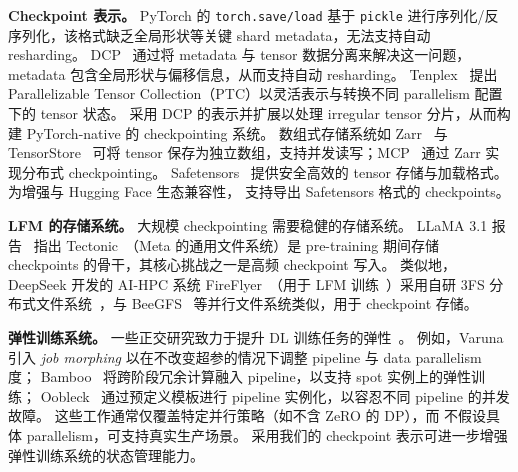 \noindent \textbf{Checkpoint 表示。}
PyTorch 的 \texttt{torch.save/load} 基于 \texttt{pickle} 进行序列化/反序列化，该格式缺乏全局形状等关键 shard metadata，无法支持自动 resharding。
DCP~\cite{torch-dcp} 通过将 metadata 与 tensor 数据分离来解决这一问题，metadata 包含全局形状与偏移信息，从而支持自动 resharding。
Tenplex~\cite{tenplex} 提出 Parallelizable Tensor Collection（PTC）以灵活表示与转换不同 parallelism 配置下的 tensor 状态。
\sys{} 采用 DCP 的表示并扩展以处理 irregular tensor 分片，从而构建 PyTorch-native 的 checkpointing 系统。
数组式存储系统如 Zarr~\cite{zarrZarr} 与 TensorStore~\cite{googleTensorStore} 可将 tensor 保存为独立数组，支持并发读写；MCP~\cite{megatron-dcp} 通过 Zarr 实现分布式 checkpointing。
Safetensors~\cite{huggingfaceSafetensors} 提供安全高效的 tensor 存储与加载格式。
为增强与 Hugging Face 生态兼容性，\sys{} 支持导出 Safetensors 格式的 checkpoints。

\noindent \textbf{LFM 的存储系统。}
大规模 checkpointing 需要稳健的存储系统。
LLaMA 3.1 报告~\cite{llama3.1} 指出 Tectonic~\cite{tectonic}（Meta 的通用文件系统）是 pre-training 期间存储 checkpoints 的骨干，其核心挑战之一是高频 checkpoint 写入。
类似地，DeepSeek 开发的 AI-HPC 系统 FireFlyer~\cite{fireflyer}（用于 LFM 训练~\cite{deepseekai,deepseek-v3,deepseek-r1}）采用自研 3FS 分布式文件系统~\cite{3fs}，与 BeeGFS~\cite{herold2014introduction} 等并行文件系统类似，用于 checkpoint 存储。

\noindent \textbf{弹性训练系统。}
一些正交研究致力于提升 DL 训练任务的弹性~\cite{varuna, bamboo, easyscale, parcae, swift, oobleck}。
例如，Varuna 引入 \textit{job morphing} 以在不改变超参的情况下调整 pipeline 与 data parallelism 度；
Bamboo~\cite{bamboo} 将跨阶段冗余计算融入 pipeline，以支持 spot 实例上的弹性训练；
Oobleck~\cite{oobleck} 通过预定义模板进行 pipeline 实例化，以容忍不同 pipeline 的并发故障。
这些工作通常仅覆盖特定并行策略（如不含 ZeRO 的 DP），而 \sys{} 不假设具体 parallelism，可支持真实生产场景。
采用我们的 checkpoint 表示可进一步增强弹性训练系统的状态管理能力。

